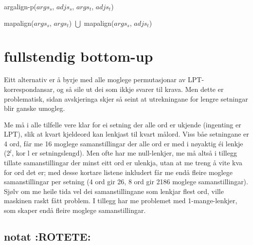 \documentclass[11pt,a4paper,oneside,draft]{book}
\begin{document}
  
  
    \begin{function}[]
    \caption{argalign-p($args_s$, $adjs_s$, $args_t$, $adjs_t$)}
    \label{argalign}
  
    \BlankLine
    
     {
        mapalign($args_s$, $args_t$) $\bigcup$ mapalign($args_s$, $adjs_t$)\;
        }
         {
          \lElse{
            $\emptyset$\;
          }
        }
      \lElse {
         \{$\emptyset$\}\;
      }
   
    \end{function}

\section{fullstendig bottom-up}
\label{sec-4.1}

Eitt alternativ er å byrje med alle moglege permutasjonar av
LPT-korrespondansar, og så sile ut dei som ikkje svarer til krava. Men
dette er problematisk, sidan avskjeringa skjer så seint at
utrekningane for lengre setningar blir ganske umogleg. 

Me må i alle tilfelle vere klar for ei setning der alle ord er ukjende
(ingenting er LPT), slik at kvart kjeldeord kan lenkjast til kvart
målord. Viss båe setningane er 4 ord, får me 16 moglege
samanstillingar der alle ord er med i nøyaktig éi lenkje (2$^l$, kor l
er setningslengd). Men ofte har me null-lenkjer, me må altså i tillegg
tillate samanstillingar der minst eitt ord er ulenkja, utan at me
treng å vite kva for ord det er; med desse kortare listene inkludert
får me endå fleire moglege samanstillingar per setning (4 ord gir 26,
8 ord gir 2186 moglege samanstillingar). Sjølv om me heile tida vel
dei samanstillingane som lenkjar flest ord, ville maskinen raskt fått
problem. I tillegg har me problemet med 1-mange-lenkjer, som skaper
endå fleire moglege samanstillingar.
\subsection{notat \textbf{:ROTETE:}}
\label{sec-4.1.1}
\end{document}
